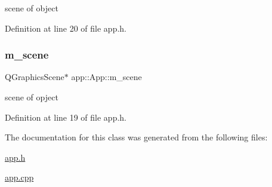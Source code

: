 scene of object 



Definition at line 20 of file app.\+h.

\mbox{\label{classapp_1_1_app_a76e6e4afa31f44b93cbbbbc3f137ec97}} 
\subsubsection{\texorpdfstring{m\+\_\+scene}{m\_scene}}
{\footnotesize\ttfamily Q\+Graphics\+Scene$\ast$ app\+::\+App\+::m\+\_\+scene\hspace{0.3cm}{\ttfamily [private]}}



scene of opject 



Definition at line 19 of file app.\+h.



The documentation for this class was generated from the following files\+:\begin{DoxyCompactItemize}
\item 
\mbox{\hyperlink{app_8h}{app.\+h}}\item 
\mbox{\hyperlink{app_8cpp}{app.\+cpp}}\end{DoxyCompactItemize}
